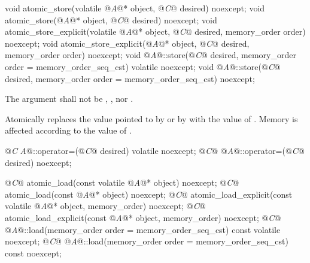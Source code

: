 %
%
%
%
%
%
\begin{itemdecl}
void atomic_store(volatile @\textit{A}@* object, @\textit{C}@ desired) noexcept;
void atomic_store(@\textit{A}@* object, @\textit{C}@ desired) noexcept;
void atomic_store_explicit(volatile @\textit{A}@* object, @\textit{C}@ desired, memory_order order) noexcept;
void atomic_store_explicit(@\textit{A}@* object, @\textit{C}@ desired, memory_order order) noexcept;
void @\textit{A}@::store(@\textit{C}@ desired, memory_order order = memory_order_seq_cst) volatile noexcept;
void @\textit{A}@::store(@\textit{C}@ desired, memory_order order = memory_order_seq_cst) noexcept;
\end{itemdecl}

\begin{itemdescr}
\pnum
\requires The  argument shall not be ,
, nor .

\pnum
\effects Atomically replaces the value pointed to by  or by 
with the value of . Memory is affected according to the value of
.
\end{itemdescr}

%
%
\begin{itemdecl}
@\textit{C} \textit{A}@::operator=(@\textit{C}@ desired) volatile noexcept;
@\textit{C}@ @\textit{A}@::operator=(@\textit{C}@ desired) noexcept;
\end{itemdecl}

\begin{itemdescr}
\pnum
\effects {}

\pnum
\returns {}
\end{itemdescr}

%
%
%
%
%
%
\begin{itemdecl}
@\textit{C}@ atomic_load(const volatile @\textit{A}@* object) noexcept;
@\textit{C}@ atomic_load(const @\textit{A}@* object) noexcept;
@\textit{C}@ atomic_load_explicit(const volatile @\textit{A}@* object, memory_order) noexcept;
@\textit{C}@ atomic_load_explicit(const @\textit{A}@* object, memory_order) noexcept;
@\textit{C}@ @\textit{A}@::load(memory_order order = memory_order_seq_cst) const volatile noexcept;
@\textit{C}@ @\textit{A}@::load(memory_order order = memory_order_seq_cst) const noexcept;
\end{itemdecl}

